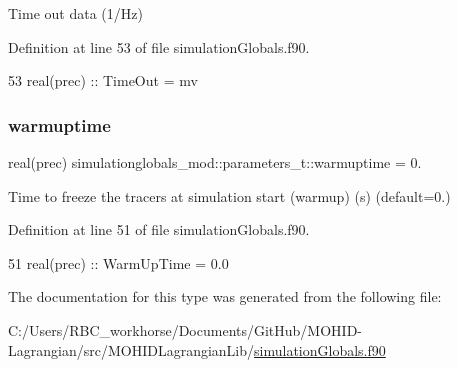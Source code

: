 Time out data (1/\+Hz) 



Definition at line 53 of file simulation\+Globals.\+f90.


\begin{DoxyCode}
53         \textcolor{keywordtype}{real(prec)}      :: TimeOut = mv              
\end{DoxyCode}
\mbox{\label{structsimulationglobals__mod_1_1parameters__t_acab4746165c72ab2947c178c95c1c577}} 
\subsubsection{\texorpdfstring{warmuptime}{warmuptime}}
{\footnotesize\ttfamily real(prec) simulationglobals\+\_\+mod\+::parameters\+\_\+t\+::warmuptime = 0.\hspace{0.3cm}{\ttfamily [private]}}



Time to freeze the tracers at simulation start (warmup) (s) (default=0.) 



Definition at line 51 of file simulation\+Globals.\+f90.


\begin{DoxyCode}
51         \textcolor{keywordtype}{real(prec)}      :: WarmUpTime = 0.0
\end{DoxyCode}


The documentation for this type was generated from the following file\+:\begin{DoxyCompactItemize}
\item 
C\+:/\+Users/\+R\+B\+C\+\_\+workhorse/\+Documents/\+Git\+Hub/\+M\+O\+H\+I\+D-\/\+Lagrangian/src/\+M\+O\+H\+I\+D\+Lagrangian\+Lib/\mbox{\hyperlink{simulation_globals_8f90}{simulation\+Globals.\+f90}}\end{DoxyCompactItemize}

